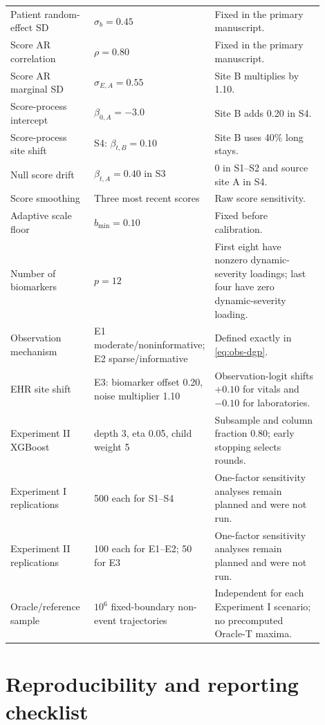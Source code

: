 \documentclass[11pt]{article}
\begin{document}
\begin{longtable}{L{0.27\linewidth}L{0.25\linewidth}L{0.38\linewidth}}
Patient random-effect SD & $\sigma_b=0.45$ & Fixed in the primary manuscript. \\
Score AR correlation & $\rho=0.80$ & Fixed in the primary manuscript. \\
Score AR marginal SD & $\sigma_{E,A}=0.55$ & Site B multiplies by 1.10. \\
Score-process intercept & $\beta_{0,A}=-3.0$ & Site B adds 0.20 in S4. \\
Score-process site shift & S4: $\beta_{t,B}=0.10$ & Site B uses 40\% long stays. \\
Null score drift & $\beta_{t,A}=0.40$ in S3 & 0 in S1--S2 and source site A in S4. \\
Score smoothing & Three most recent scores & Raw score sensitivity. \\
Adaptive scale floor & $b_{\min}=0.10$ & Fixed before calibration. \\
Number of biomarkers & $p=12$ & First eight have nonzero dynamic-severity loadings; last four have zero dynamic-severity loading. \\
Observation mechanism & E1 moderate/noninformative; E2 sparse/informative & Defined exactly in \eqref{eq:obs-dgp}. \\
EHR site shift & E3: biomarker offset 0.20, noise multiplier 1.10 & Observation-logit shifts $+0.10$ for vitals and $-0.10$ for laboratories. \\
Experiment II XGBoost & depth 3, eta 0.05, child weight 5 & Subsample and column fraction 0.80; early stopping selects rounds. \\
Experiment I replications & 500 each for S1--S4 & One-factor sensitivity analyses remain planned and were not run. \\
Experiment II replications & 100 each for E1--E2; 50 for E3 & One-factor sensitivity analyses remain planned and were not run. \\
Oracle/reference sample & $10^6$ fixed-boundary non-event trajectories & Independent for each Experiment I scenario; no precomputed Oracle-T maxima. \\
\bottomrule
\end{longtable}

\section{Reproducibility and reporting checklist}\label{app:checklist}
\end{document}
